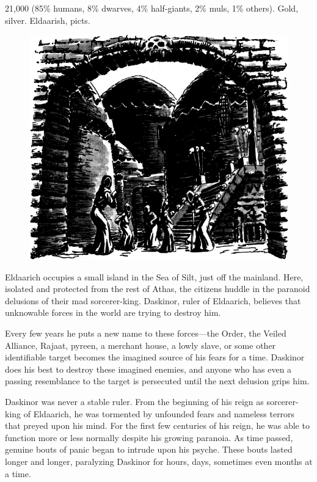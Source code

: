 {21,000 (85\% humans, 8\% dwarves, 4\% half-giants, 2\% muls, 1\% others).}
{Gold, silver.}
{Eldaarish, picts.}
{
\begin{figure}[b!]
\centering
\includegraphics[height=0.4\paperheight]{images/eldaarich-1.png}
\WOTC
\end{figure}

	Eldaarich occupies a small island in the Sea of Silt, just off the mainland. Here, isolated and protected from the rest of Athas, the citizens huddle in the paranoid delusions of their mad sorcerer-king. Daskinor, ruler of Eldaarich, believes that unknowable forces in the world are trying to destroy him.

	Every few years he puts a new name to these forces---the Order, the Veiled Alliance, Rajaat, pyreen, a merchant house, a lowly slave, or some other identifiable target becomes the imagined source of his fears for a time. Daskinor does his best to destroy these imagined enemies, and anyone who has even a passing resemblance to the target is persecuted until the next delusion grips him.

	Daskinor was never a stable ruler. From the beginning of his reign as sorcerer-king of Eldaarich, he was tormented by unfounded fears and nameless terrors that preyed upon his mind. For the first few centuries of his reign, he was able to function more or less normally despite his growing paranoia. As time passed, genuine bouts of panic began to intrude upon his psyche. These bouts lasted longer and longer, paralyzing Daskinor for hours, days, sometimes even months at a time.

}
